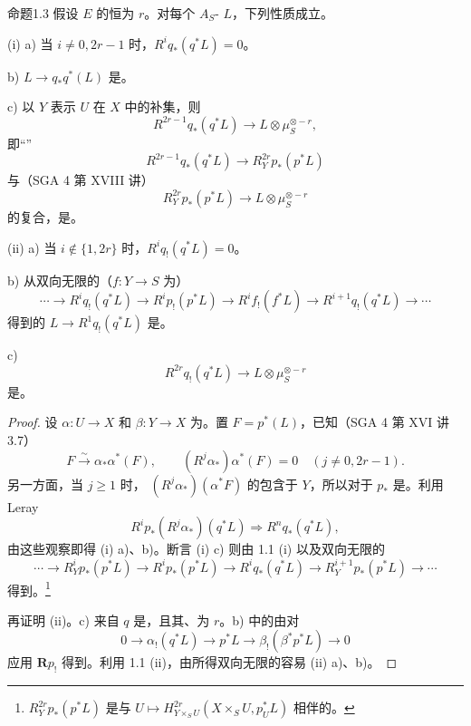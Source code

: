 \begin{SGAresult}{命题}{1.3}
假设 $E$ 的恒为 $r$。对每个 $A_S$- $L$，下列性质成立。

(i) a) 当 $i\ne0,2r-1$ 时，$R^iq_*(q^*L)=0$。

b)  $L\to q_*q^*(L)$ 是。

c) 以 $Y$ 表示 $U$ 在 $X$ 中的补集，则
\[
 R^{2r-1}q_*(q^*L)\longrightarrow L\otimes\mu_S^{\otimes-r},
\]
即“”
\[
 R^{2r-1}q_*(q^*L)\longrightarrow R_Y^{2r}p_*(p^*L)\tag{1}
\]
与（SGA 4 第 XVIII 讲）
\[
 R_Y^{2r}p_*(p^*L)\longrightarrow L\otimes\mu_S^{\otimes-r}
\]
的复合，是。

(ii) a) 当 $i\notin\{1,2r\}$ 时，$R^iq_!(q^*L)=0$。

b) 从双向无限的（$f:Y\to S$ 为）
\[
 \cdots\longrightarrow R^iq_!(q^*L)\longrightarrow R^ip_!(p^*L)
 \longrightarrow R^if_!(f^*L)\longrightarrow R^{i+1}q_!(q^*L)\longrightarrow\cdots
\]
得到的 $L\to R^1q_!(q^*L)$ 是。

c) 
\[
 R^{2r}q_!(q^*L)\longrightarrow L\otimes\mu_S^{\otimes-r}
\]
是。
\end{SGAresult}
\begin{proof}
设 $\alpha:U\to X$ 和 $\beta:Y\to X$ 为。置 $F=p^*(L)$，已知（SGA 4 第 XVI 讲 3.7）
\[
 F\xrightarrow{\sim}\alpha_*\alpha^*(F),\qquad
 (R^j\alpha_*)\alpha^*(F)=0\quad(j\ne0,2r-1).
\]
另一方面，当 $j\ge1$ 时， $(R^j\alpha_*)(\alpha^*F)$ 的包含于 $Y$，所以对于 $p_*$ 是。利用 Leray 
\[
 R^ip_*(R^j\alpha_*)(q^*L)\Longrightarrow R^nq_*(q^*L),
\]
由这些观察即得 (i) a)、b)。断言 (i) c) 则由 1.1 (i) 以及双向无限的
\[
 \cdots\longrightarrow R_Y^ip_*(p^*L)\longrightarrow R^ip_*(p^*L)
 \longrightarrow R^iq_*(q^*L)\longrightarrow R_Y^{i+1}p_*(p^*L)\longrightarrow\cdots
\]
得到。\footnote{ $R_Y^{2r}p_*(p^*L)$ 是与 $U\mapsto H^{2r}_{Y\times_SU}(X\times_SU,p_U^*L)$ 相伴的。}

再证明 (ii)。c) 来自 $q$ 是，且其、为 $r$。b) 中的由对
\[
 0\longrightarrow\alpha_!(q^*L)\longrightarrow p^*L
 \longrightarrow\beta_!(\beta^*p^*L)\longrightarrow0
\]
应用 $\mathbf Rp_!$ 得到。利用 1.1 (ii)，由所得双向无限的容易 (ii) a)、b)。
\end{proof}

